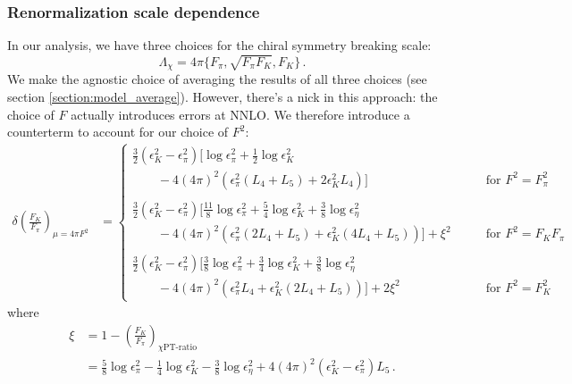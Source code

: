 \documentclass[prd,tightenlines,preprintnumbers,showpacs,superscriptaddress,notitlepage,eqsecnum,floatfix,notitlepage]{revtex4-1}
\begin{document}
\subsubsection{Renormalization scale dependence} \label{section:renormalization}
In our analysis, we have three choices for the chiral symmetry breaking scale:
\begin{equation}
\Lambda_\chi  = 4 \pi \{ F_\pi, \sqrt{F_\pi F_K}, F_K\} \, .
\end{equation}
We make the agnostic choice of averaging the results of all three choices (see section \ref{section:model_average}). However, there's a nick in this approach: the choice of $F$ actually introduces errors at NNLO. We therefore introduce a counterterm to account for our choice of $F^2$:
\begin{align}
\delta\left(\frac{F_K}{F_\pi}\right)_{\mu = 4\pi F^2} &=
\begin{cases}
\frac 32 \left( \epsilon^2_K - \epsilon_\pi^2 \right) \big[
\log \epsilon_\pi^2 + \frac 12 \log \epsilon^2_K \\
\qquad - 4 (4\pi)^2 \left( \epsilon_\pi^2 (L_4 + L_5 ) + 2\epsilon_K^2 L_4 \right)
\big] 
&\qquad \text{for $F^2= F_\pi^2$} \\ \\
\frac 32 \left( \epsilon^2_K - \epsilon_\pi^2 \right) \big[
\frac{11}{8} \log \epsilon_\pi^2 + \frac 54 \log \epsilon^2_K + \frac 38 \log \epsilon_\eta^2 \\
\qquad - 4 (4\pi)^2 \left( \epsilon_\pi^2 (2 L_4 + L_5) + \epsilon_K^2 (4 L_4 + L_5) \right)
\big] + \xi^2
&\qquad \text{for $F^2= F_K F_\pi $} \\ \\
\frac 32 \left( \epsilon^2_K - \epsilon_\pi^2 \right) \big[
\frac{3}{8} \log \epsilon_\pi^2 + \frac 34 \log \epsilon^2_K + \frac 38 \log \epsilon_\eta^2 \\
\qquad - 4 (4\pi)^2 \left( \epsilon_\pi^2 L_4 + \epsilon_K^2  (2 L_4 + L_5) \right)
\big] + 2 \xi^2
&\qquad \text{for $F^2= F_K^2$}
\end{cases}
\end{align}
where
\begin{align}
\xi & = 1 - \left(\frac{F_K}{F_\pi}\right)_\text{$\chi$PT-ratio} \\
&=  \frac 58 \log \epsilon_\pi^2 - \frac 14 \log \epsilon_K^2 - \frac 38 \log \epsilon_\eta^2 
+ 4 (4 \pi)^2 \left(\epsilon_K^2 - \epsilon_\pi^2\right) L_5 \, . \nonumber
\end{align}
\end{document}
